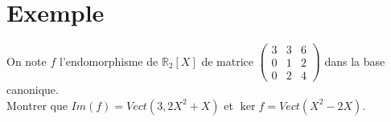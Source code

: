 \documentclass[../main.tex]{subfiles}
\begin{document}
\section{Exemple}
\begin{tcolorbox}[title=Exemple 28.20, title filled=false, colframe=darkgreen, colback=darkgreen!10!white]
    On note $f$ l'endomorphisme de $\mathbb{R}_2[X]$ de matrice $\begin{pmatrix}
        3 & 3 & 6 \\
        0 & 1 & 2 \\
        0 & 2 & 4
    \end{pmatrix}$ dans la base canonique. \\
    Montrer que $Im(f) = Vect(3, 2X^2 + X)$ et $\ker f = Vect(X^2 - 2X)$. 
\end{tcolorbox}
\end{document}
